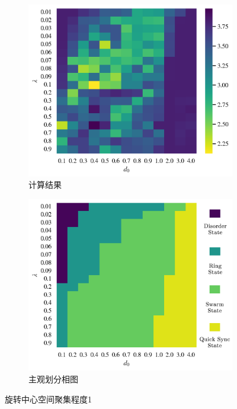 \documentclass{article}
\begin{document}
\begin{figure}[H]
	\centering
	\begin{subfigure}[b]{0.49\textwidth}
		\includegraphics[width=\textwidth]{./figs/centerAggOp1.png}
		\vspace{-1cm}
		\caption{计算结果}
	\end{subfigure}
	\begin{subfigure}[b]{0.49\textwidth}
		\includegraphics[width=\textwidth]{./figs/subjectiveOp.png}
		\vspace{-1cm}
		\caption{主观划分相图}
	\end{subfigure}
	\vspace{-0.5cm}
	\caption{旋转中心空间聚集程度1}
	\vspace{-0.5cm}
	\label{fig:fig234c.3}
\end{figure}
\end{document}
